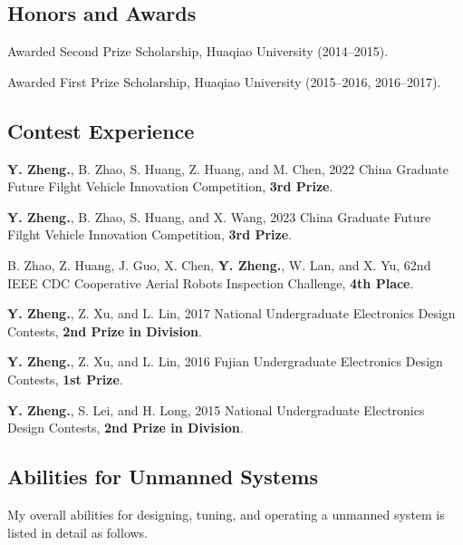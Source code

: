 \documentclass[11pt]{article}
\begin{document}
\subsection*{Honors and Awards}

\begin{bibenum}[itemsep=5pt]
    \item Awarded Second Prize Scholarship, Huaqiao University (2014--2015).
    \item Awarded First Prize Scholarship, Huaqiao University (2015--2016, 2016--2017).
\end{bibenum}



\subsection*{Contest Experience}

\begin{bibenum}[itemsep=5pt]
    \item \textbf{Y. Zheng.}, B. Zhao, S. Huang, Z. Huang, and M. Chen, 2022 China Graduate Future Filght Vehicle Innovation Competition, \textbf{3rd Prize}.
    \item \textbf{Y. Zheng.}, B. Zhao, S. Huang, and X. Wang, 2023 China Graduate Future Filght Vehicle Innovation Competition, \textbf{3rd Prize}.
    \item B. Zhao, Z. Huang, J. Guo, X. Chen, \textbf{Y. Zheng.}, W. Lan,  and  X. Yu, 62nd IEEE CDC Cooperative Aerial Robots Inspection Challenge, \textbf{4th Place}.
    \item \textbf{Y. Zheng.}, Z. Xu, and L. Lin, 2017 National Undergraduate Electronics Design Contests, \textbf{2nd Prize in Division}.
    \item \textbf{Y. Zheng.}, Z. Xu, and  L. Lin, 2016 Fujian Undergraduate Electronics Design Contests, \textbf{1st Prize}.
    \item \textbf{Y. Zheng.}, S. Lei, and H. Long, 2015 National Undergraduate Electronics Design Contests, \textbf{2nd Prize in Division}.



\end{bibenum}

\subsection*{Abilities for Unmanned Systems}


My overall abilities for designing, tuning, and operating a unmanned system is listed in detail as follows.
\end{document}
